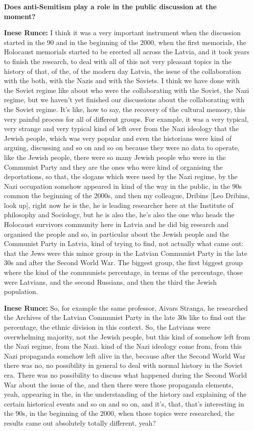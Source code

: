 \textbf{Does anti-Semitism play a role in the public discussion at the moment?}

\textbf{Inese Runce:} I think it was a very important instrument when the discussion started in the 90 and in the beginning of the 2000, when the first memorials, the Holocaust memorials started to be erected all across the Latvia, and it took years to finish the research, to deal with all of this not very pleasant topics in the history of that, of the, of the modern day Latvia, the issue of the collaboration with the both, with the Nazis and with the Soviets. I think we have done with the Soviet regime like about who were the collaborating with the Soviet, the Nazi regime, but we haven’t yet finished our discussions about the collaborating with the Soviet regime. It's like, how to say, the recovery of the cultural memory, this very painful process for all of different groups. For example, it was a very typical, very strange and very typical kind of left over from the Nazi ideology that the Jewish people, which was very popular and even the historians were kind of arguing, discussing and so on and so on because they were no data to operate, like the Jewish people, there were so many Jewish people who were in the Communist Party and they are the ones who were kind of organising the deportations, so that, the slogans which were used by the Nazi regime,  by the Nazi occupation somehow appeared in kind of the way in the public, in the 90s common the beginning of the 2000s, and then my colleague, Dribins [Leo Dribins, look up], right now he is the,  he is leading researcher here at the Institute of philosophy and Sociology, but he is also the, he's also the one who heads the Holocaust survivors community here in Latvia and he did big research and organised the people and so, in particular about the Jewish people and the Communist Party in Latvia, kind of trying to find, not actually what came out: that the Jews were this minor group in the Latvian Communist Party in the late 30s and after the Second World War. The biggest group, the first biggest group where the kind of the communists percentage, in terms of the percentage, those were Latvians, and the second Russians, and then the third the Jewish population. 
 
\textbf{Inese Runce:} So, for example the same professor, Aivars Stranga, he researched the Archives of the Latvian Communist Party in the late 30s like to find out the percentage, the ethnic division in this context. So, the Latvians were overwhelming majority, not the Jewish people, but this kind of somehow left from the Nazi regime, from the Nazi. kind of the Nazi ideology come from, from this Nazi propaganda somehow left alive in the, because after the Second World War there was no, no possibility in general to deal with normal history in the Soviet era. There was no possibility to discuss what happened during the Second World War about the issue of the, and then there were those propaganda elements, yeah, appearing in the, in the understanding of the history and explaining of the certain historical events and so on and so on, and it's, that,  that's interesting in the 90s, in the beginning of the 2000, when those topics were researched, the results came out absolutely totally different, yeah?

